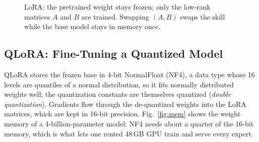 \begin{figure}[!t]
\centering
{}
\caption{LoRA: the pretrained weight stays frozen; only the low-rank matrices $A$ and $B$ are trained. Swapping $(A,B)$ swaps the skill while the base model stays in memory once.}
\label{fig:lora}
\end{figure}

\subsection{QLoRA: Fine-Tuning a Quantized Model}
QLoRA \cite{dettmers2023qlora} stores the frozen base in 4-bit NormalFloat (NF4), a data type whose 16 levels are quantiles of a normal distribution, so it fits normally distributed weights well; the quantization constants are themselves quantized (\emph{double quantization}). Gradients flow through the de-quantized weights into the LoRA matrices, which are kept in 16-bit precision. Fig.~\ref{fig:mem} shows the weight memory of a 4-billion-parameter model: NF4 needs about a quarter of the 16-bit memory, which is what lets one rented 48\,GB GPU train and serve every expert.

